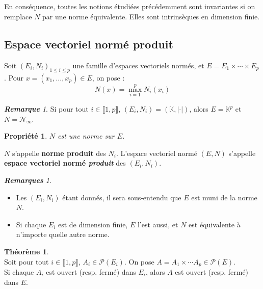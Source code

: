 \documentclass[12pt]{book}
\let\ensembleNombre\mathbb
\newcommand*\K{\ensuremath{\ensembleNombre{K}}}
\newtheorem*{prop}{Propriété}
\theoremstyle{definition}
\newtheorem{thme}{Théorème}[chapter]
\theoremstyle{remark}
\newtheorem*{rem}{\textbf{Remarque}}
\newtheorem*{rems}{\textbf{Remarques}}
\newenvironment{fthme}
  {\begin{mdframed}[roundcorner=10pt, linewidth=2pt]\begin{thme}}
  {\end{thme}\end{mdframed}}
\begin{document}
	\mbox{~}\\	\mbox{~}\\	\mbox{~}\\ \mbox{~}\\
		
	En conséquence, toutes les notions étudiées précédemment sont invariantes si on remplace $N$ par une norme équivalente. Elles sont intrinsèques en dimension finie.
	
	\subsection{Espace vectoriel normé produit}
	Soit $(E_i, N_i)_{1\leq i\leq p}$ une famille d'espaces vectoriels normés, et $E = E_1 \times \cdots \times E_p$. Pour $x = (x_1, \ldots, x_p) \in E$, on pose : 
	\[\boxed{ N(x) = \max_{i=1}^p N_i(x_i) }\]
	
	\begin{rem}
	Si pour tout $i \in \llbracket 1, p \rrbracket$, $(E_i, N_i) = (\K, |\cdot|)$, alors $E = \K^p$ et $N = \mathcal N_{\infty}$.
	\end{rem}
	
	\begin{prop}
	$N$ est une norme sur $E$.
	\end{prop}
	
	$N$ s'appelle \textbf{norme produit} des $N_i$. L'espace vectoriel normé $(E,N)$ s'appelle \textbf{espace vectoriel normé \emph{produit}} des $(E_i, N_i)$.
	
	\begin{rems}\mbox{~}\\
	\begin{itemize}
	\item Les $(E_i, N_i)$ étant donnés, il sera sous-entendu que $E$ est muni de la norme $N$.
	\item Si chaque $E_i$ est de dimension finie, $E$ l'est aussi, et $N$ est équivalente à n'importe quelle autre norme.
	\end{itemize}
	\end{rems}
	
	\begin{fthme}\mbox{~}\\
	Soit pour tout $i \in \llbracket 1, p \rrbracket$, $A_i \in \mathcal P(E_i)$. On pose $A = A_1 \times \cdots A_p \in \mathcal P(E)$.\\
	Si chaque $A_i$ est ouvert (resp. fermé) dans $E_i$, alors $A$ est ouvert (resp. fermé) dans $E$.
	\end{fthme}
	
\end{document}
